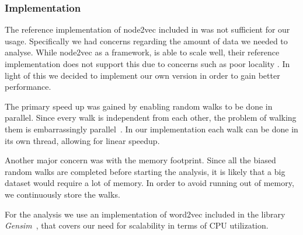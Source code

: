 \subsubsection{Implementation}
The reference implementation of node2vec included in \cite{node2vec} was not sufficient for our usage. Specifically we had concerns regarding the amount of data we needed to analyse. While node2vec as a framework, is able to scale well, their reference implementation does not support this due to concerns such as poor locality . In light of this we decided to implement our own version in order to gain better performance.

The primary speed up was gained by enabling random walks to be done in parallel. Since every walk is independent from each other, the problem of walking them is embarrassingly parallel~\cite{matloff2011art}. In our implementation each walk can be done in its own thread, allowing for linear speedup.


Another major concern was with the memory footprint. Since all the biased random walks are completed before starting the analysis, it is likely that a big dataset would require a lot of memory. In order to avoid running out of memory, we continuously store the walks.

For the analysis we use an implementation of word2vec included in the library \emph{Gensim}~\cite{rehurek_lrec}, that covers our need for scalability in terms of CPU utilization.
